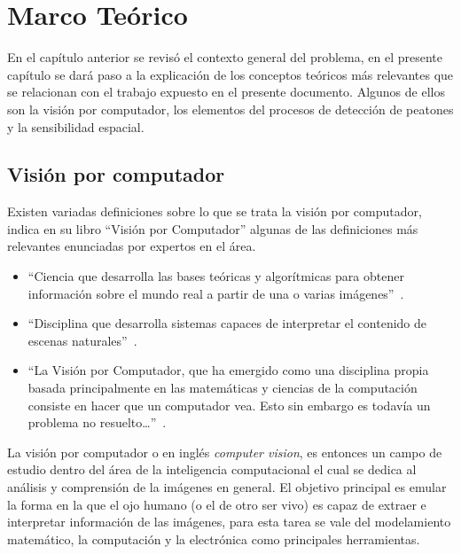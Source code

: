 
\chapter{Marco Te\'orico}
\label{cap:preliminares}

En el capítulo anterior se revisó el contexto general del problema, en el presente capítulo se dará paso a la explicación de los conceptos teóricos más relevantes que se relacionan con el trabajo expuesto en el presente documento. Algunos de ellos son la visión por computador, los elementos del procesos de detección de peatones y la sensibilidad espacial.

\section{Visión por computador}
\label{preliminares:cv}

Existen variadas definiciones sobre lo que se trata la visión por computador, \cite{mery2004} indica en su libro ``Visión por Computador'' algunas de las definiciones más relevantes enunciadas por expertos en el área.

\begin{itemize}
\item ``Ciencia que desarrolla las bases teóricas y algorítmicas para obtener información sobre el mundo real a partir de una o varias imágenes''~\citep{haralick1992}.
\item ``Disciplina que desarrolla sistemas capaces de interpretar el contenido de escenas naturales''~\citep{kennethr.1996}.
\item ``La Visión por Computador, que ha emergido como una disciplina propia basada principalmente en las matemáticas y ciencias de la computación consiste en hacer que un computador vea. Esto sin embargo es todavía un problema no resuelto\ldots''~\citep{hartley2003}.
\end{itemize}

La visión por computador o en inglés \textit{computer vision}, es entonces un campo de estudio dentro del área de la inteligencia computacional el cual se dedica al análisis y comprensión de la imágenes en general. El objetivo principal es emular la forma en la que el ojo humano (o el de otro ser vivo) es capaz de extraer e interpretar información de las imágenes, para esta tarea se vale del modelamiento matemático, la computación y la electrónica como principales herramientas. 

